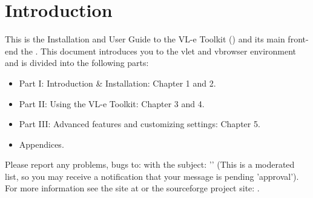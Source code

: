 \chapter{Introduction}
\label{sec:Introduction}




This is the Installation and User Guide to the VL-e Toolkit (\vlet) and its
main front-end the \vbrowser. 
This document introduces you to the vlet and vbrowser 
environment and is divided into the following parts: 

\begin{itemize} 
  \item 
    Part I: Introduction \& Installation: Chapter 1 and 2.
  \item 
    Part II: Using the VL-e Toolkit: Chapter 3 and 4. 
  \item
    Part III: Advanced features and customizing settings: Chapter 5.  
  \item
    Appendices.  
\end{itemize} 

Please report any problems, bugs to:  with the subject: 
'' (This is a moderated list, so you may receive a
notification that your message is pending 'approval'). \\
For more information see the site at  or the
sourceforge project site: .
